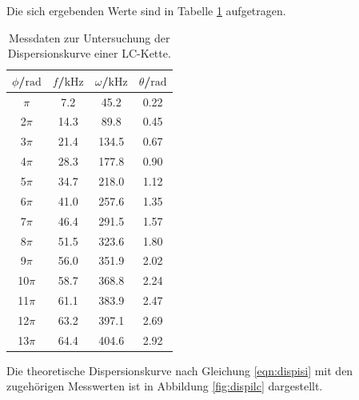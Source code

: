 Die sich ergebenden Werte sind in Tabelle \ref{tab:dispersionlc} aufgetragen.

\begin{table}
	\caption{Messdaten zur Untersuchung der Dispersionskurve einer LC-Kette.}
	\label{tab:dispersionlc}
	\centering
	\begin{tabular}{cccc}
		\toprule
		$\phi$/$\si{\radian}$ & $f$/$\si{\kilo\Hz}$ & $\omega$/$\si{\kilo\Hz}$ & $\theta$/$\si{\radian}$ \\
		\midrule
		$\pi$                 & 7.2                 & 45.2                     & 0.22                    \\
		2$\pi$                & 14.3                & 89.8                     & 0.45                    \\
		3$\pi$                & 21.4                & 134.5                    & 0.67                    \\
		4$\pi$                & 28.3                & 177.8                    & 0.90                    \\
		5$\pi$                & 34.7                & 218.0                    & 1.12                    \\
		6$\pi$                & 41.0                & 257.6                    & 1.35                    \\
		7$\pi$                & 46.4                & 291.5                    & 1.57                    \\
		8$\pi$                & 51.5                & 323.6                    & 1.80                    \\
		9$\pi$                & 56.0                & 351.9                    & 2.02                    \\
		10$\pi$               & 58.7                & 368.8                    & 2.24                    \\
		11$\pi$               & 61.1                & 383.9                    & 2.47                    \\
		12$\pi$               & 63.2                & 397.1                    & 2.69                    \\
		13$\pi$               & 64.4                & 404.6                    & 2.92                    \\
		\bottomrule
	\end{tabular}
\end{table}

Die theoretische Dispersionskurve nach Gleichung \eqref{eqn:dispisi} mit den zugehörigen
Messwerten ist in Abbildung \ref{fig:dispilc} dargestellt.

